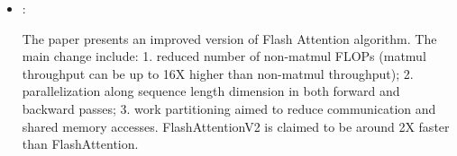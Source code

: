 \begin{itemize}
    \item \cite{Dao:FlashAttentionV2:2023}:

    The paper presents an improved version of Flash Attention algorithm. The main change include: 1. reduced number of non-matmul FLOPs (matmul throughput can be up to 16X higher than non-matmul throughput); 2. parallelization along sequence length dimension in both forward and backward passes; 3. work partitioning aimed to reduce communication and shared memory accesses. FlashAttentionV2 is claimed to be around 2X faster than FlashAttention.
\end{itemize}

